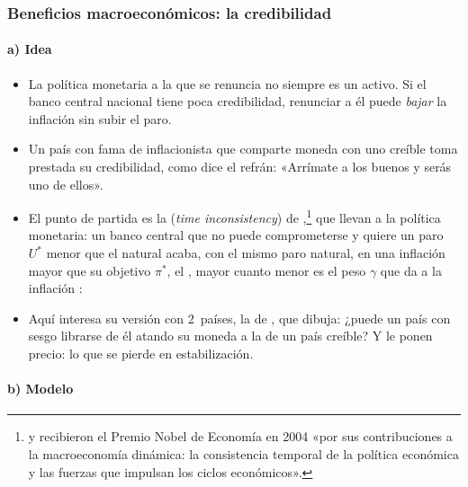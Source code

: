 \documentclass[11pt]{article}
\begin{document}
\subsubsection{Beneficios macroeconómicos: la credibilidad}\label{sec:credibilidad}

\paragraph{a) Idea}

\begin{itemize}
\item La política monetaria a la que se renuncia no siempre es un activo. Si el banco central nacional tiene poca credibilidad, renunciar a él puede \emph{bajar} la inflación sin subir el paro.
\item Un país con fama de inflacionista que comparte moneda con uno creíble toma prestada su credibilidad, como dice el refrán: «Arrímate a los buenos y serás uno de ellos».
\item El punto de partida es la  (\emph{time inconsistency}) de \textcite{KydlandPrescott1977Rules},\footnote{ y  recibieron el Premio Nobel de Economía en 2004 «por sus contribuciones a la macroeconomía dinámica: la consistencia temporal de la política económica y las fuerzas que impulsan los ciclos económicos»\nocite{Nobel2004KydlandPrescott}.} que \textcite{BarroGordon1983Positive} llevan a la política monetaria: un banco central que no puede comprometerse y quiere un paro $U^*$ menor que el natural acaba, con el mismo paro natural, en una inflación mayor que su objetivo $\pi^*$, el , mayor cuanto menor es el peso $\gamma$ que da a la inflación :
\item Aquí interesa su versión con 2~países, la de \textcite{GiavazziPagano1988Advantage}, que \textcite[cap.~2]{DeGrauwe2022Economics} dibuja: ¿puede un país con sesgo librarse de él atando su moneda a la de un país creíble? Y \textcite{AlesinaBarro2002} le ponen precio: lo que se pierde en estabilización.
\end{itemize}

\paragraph{b) Modelo}
\end{document}
